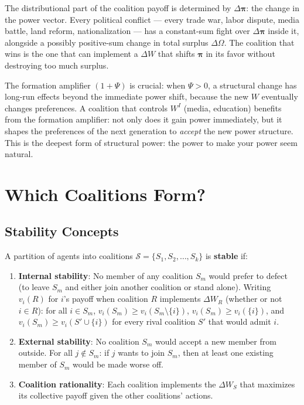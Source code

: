 \documentclass[../structural_economics_book.tex]{subfiles}
\begin{document}
\begin{keyinsight}
The distributional part of the coalition payoff is determined by $\Delta\boldsymbol{\pi}$: the change in the power vector. Every political conflict --- every trade war, labor dispute, media battle, land reform, nationalization --- has a constant-sum fight over $\Delta\boldsymbol{\pi}$ inside it, alongside a possibly positive-sum change in total surplus $\Delta\Omega$. The coalition that wins is the one that can implement a $\Delta W$ that shifts $\boldsymbol{\pi}$ in its favor without destroying too much surplus.

The formation amplifier $(1 + \Psi)$ is crucial: when $\Psi > 0$, a structural change has long-run effects beyond the immediate power shift, because the new $W$ eventually changes preferences. A coalition that controls $W^I$ (media, education) benefits from the formation amplifier: not only does it gain power immediately, but it shapes the preferences of the next generation to \textit{accept} the new power structure. This is the deepest form of structural power: the power to make your power seem natural.
\end{keyinsight}


\section{Which Coalitions Form?}
\label{ch14:sec:which}

\subsection{Stability Concepts}

\begin{definition}\label{ch14:def:stable}
A partition of agents into coalitions $\mathcal{S} = \{S_1, S_2, \ldots, S_k\}$ is \textbf{stable} if:
\begin{enumerate}
\item \textbf{Internal stability}: No member of any coalition $S_m$ would prefer to defect (to leave $S_m$ and either join another coalition or stand alone). Writing $v_i(R)$ for $i$'s payoff when coalition $R$ implements $\Delta W_R$ (whether or not $i \in R$): for all $i \in S_m$, $v_i(S_m) \geq v_i(S_m \setminus \{i\})$, $v_i(S_m) \geq v_i(\{i\})$, and $v_i(S_m) \geq v_i(S' \cup \{i\})$ for every rival coalition $S'$ that would admit $i$.
\item \textbf{External stability}: No coalition $S_m$ would accept a new member from outside. For all $j \notin S_m$: if $j$ wants to join $S_m$, then at least one existing member of $S_m$ would be made worse off.
\item \textbf{Coalition rationality}: Each coalition implements the $\Delta W_S$ that maximizes its collective payoff given the other coalitions' actions.
\end{enumerate}
\end{definition}
\end{document}
